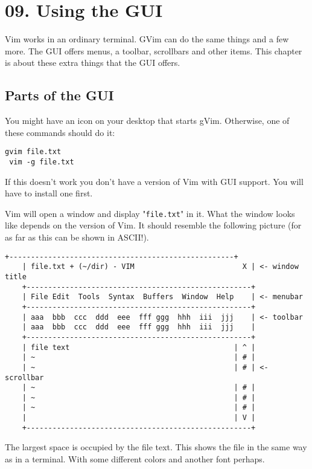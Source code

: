\section{09. Using the GUI}
Vim works in an ordinary terminal.  GVim can do the same things and a few
more.  The GUI offers menus, a toolbar, scrollbars and other items.  This
chapter is about these extra things that the GUI offers.
\subsection{Parts of the GUI}

You might have an icon on your desktop that starts gVim.
Otherwise, one of these commands should do it:

 \begin{Verbatim}[samepage=true]
 gvim file.txt
 vim -g file.txt
 \end{Verbatim}

If this doesn't work you don't have a version of Vim with GUI support.
You will have to install one first.

Vim will open a window and display "\texttt{file.txt}" in it.
What the window looks like depends on the version of Vim.
It should resemble the following picture (for as far as this can be shown in ASCII!).

\begin{Verbatim}[samepage=true]
    +----------------------------------------------------+
    | file.txt + (~/dir) - VIM                         X | <- window title
    +----------------------------------------------------+
    | File Edit  Tools  Syntax  Buffers  Window  Help    | <- menubar
    +----------------------------------------------------+
    | aaa  bbb  ccc  ddd  eee  fff ggg  hhh  iii  jjj    | <- toolbar
    | aaa  bbb  ccc  ddd  eee  fff ggg  hhh  iii  jjj    |
    +----------------------------------------------------+
    | file text                                      | ^ |
    | ~                                              | # |
    | ~                                              | # | <- scrollbar
    | ~                                              | # |
    | ~                                              | # |
    | ~                                              | # |
    |                                                | V |
    +----------------------------------------------------+
\end{Verbatim}

The largest space is occupied by the file text.
This shows the file in the same way as in a terminal.
With some different colors and another font perhaps.
